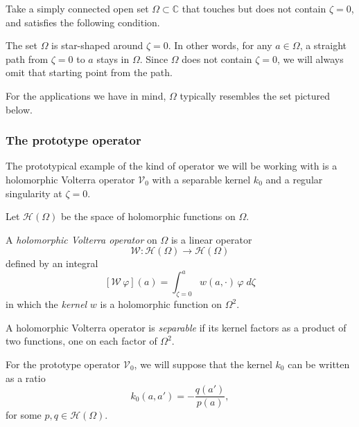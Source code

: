 \documentclass[review]{siamart220329}
\makeatletter
\newcommand{\cond}[1]{\item[(\textsc{#1})]\protected@edef\@currentlabel{\textsc{#1}}}
\newcommand{\C}{\mathbb{C}}
\newcommand{\holo}{\mathcal{H}}
\newcommand{\genvolterra}{\mathcal{W}}
\newcommand{\genker}{w}
\newcommand{\hardpart}{\mathcal{V}_0}
\newcommand{\hardker}{k_0}
\newcommand{\domain}{\Omega}
\makeatother
\begin{document}
Take a simply connected open set $\domain \subset \C$ that touches but does not contain $\zeta = 0$, and satisfies the following condition.
\begin{conditions}
\cond{star}\label{cond:star} The set $\domain$ is star-shaped around $\zeta = 0$. In other words, for any $a \in \domain$, a straight path from $\zeta = 0$ to $a$ stays in $\domain$. Since $\domain$ does not contain $\zeta = 0$, we will always omit that starting point from the path.
\end{conditions}
For the applications we have in mind, $\domain$ typically resembles the set pictured below.
\begin{center}
\end{center}
%
\subsubsection{The prototype operator}\label{setting:basic}
The prototypical example of the kind of operator we will be working with is a holomorphic Volterra operator $\hardpart$ with a separable kernel $\hardker$ and a regular singularity at $\zeta = 0$.

Let $\holo(\domain)$ be the space of holomorphic functions on $\domain$.
\begin{definition}\label{defn:volterra}
A {\em holomorphic Volterra operator} on $\domain$ is a linear operator
\[\genvolterra\colon\holo(\domain)\to\holo(\domain) \]
defined by an integral
\[ [\genvolterra\,\varphi](a) = \int_{\zeta = 0}^a \genker(a, \cdot)\,\varphi\;d\zeta \]
in which the {\em kernel} $w$ is a holomorphic function on $\Omega^2$.
\end{definition}
\begin{definition}
A holomorphic Volterra operator is {\em separable} if its kernel factors as a product of two functions, one on each factor of $\Omega^2$.
\end{definition}
For the prototype operator $\hardpart$, we will suppose that the kernel $\hardker$ can be written as a ratio
\[ \hardker(a, a') = - \frac{q(a')}{p(a)}, \]
for some $p, q \in \mathcal{H}(\Omega)$.
\end{document}

